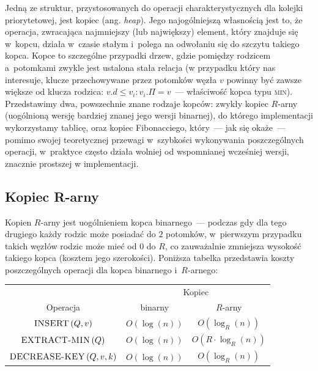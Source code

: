 Jedną ze struktur, przystosowanych do operacji charakterystycznych dla kolejki priorytetowej, jest kopiec (ang. \textit{heap}).
Jego najogólniejszą własnością jest to, że operacja, zwracająca najmniejszy (lub największy) element, który znajduje się w~kopcu, działa w~czasie stałym i~polega na odwołaniu się do szczytu takiego kopca.
Kopce to szczególne przypadki drzew, gdzie pomiędzy rodzicem a~potomkami zwykle jest ustalona stała relacja (w przypadku który nas interesuje, klucze przechowywane przez potomków węzła $v$ powinny być zawsze większe od klucza rodzica: $v.d \leqslant v_{i} : v_{i}.\Pi = v$~--- właściwość kopca typu \textsc{min}).
Przedstawimy dwa, powszechnie znane rodzaje kopców: zwykły kopiec $R$-arny (uogólnioną wersję bardziej znanej jego wersji binarnej), do którego implementacji wykorzystamy tablicę, oraz kopiec Fibonacciego, który~--- jak się okaże~--- pomimo swojej teoretycznej przewagi w~szybkości wykonywania poszczególnych operacji, w~praktyce często działa wolniej od wspomnianej wcześniej wersji, znacznie prostszej w implementacji.



\subsection{Kopiec R-arny}



Kopien $R$-arny jest uogólnieniem kopca binarnego~--- podczas gdy dla tego drugiego każdy rodzic może posiadać do $2$ potomków, w~pierwszym przypadku takich węzłów rodzic może mieć od $0$ do $R$, co zauważalnie zmniejsza wysokość takiego kopca (kosztem jego szerokości).
Poniższa tabelka przedstawia koszty poszczególnych operacji dla kopca binarnego i~$R$-arnego:

\begin{center}
	\begin{tabular}{ccc}
		& \multicolumn{2}{c}{Kopiec} \\
		\cline{2-3}
		Operacja & binarny & $R$-arny \\
		\hline
		$\textrm{\textsc{INSERT}} \left( Q, v \right)$ & $O \left( \log \left( n \right) \right)$ & $O \left( \log_{R} \left( n \right) \right)$ \\
		$\textrm{\textsc{EXTRACT-MIN}} \left( Q \right)$ & $O \left( \log \left( n \right) \right)$ & $O \left( R \cdot \log_{R} \left( n \right) \right)$ \\
		$\textrm{\textsc{DECREASE-KEY}} \left( Q, v, k \right)$ & $O \left( \log \left( n \right) \right)$ & $O \left( \log_{R} \left( n \right) \right)$  \\
		\hline
	\end{tabular}
\end{center}


